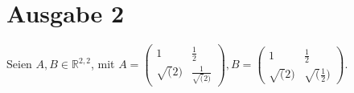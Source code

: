 \documentclass[11pt,a4paper,ngerman]{article}
\begin{document}

\section*{Ausgabe 2}

Seien $A,B \in \mathbb{R}^{2,2}$, mit
$ A = \left(
        \begin{array}{cc}
          1         & \frac{1}{2} \\
          \sqrt(2)  & \frac{1}{\sqrt(2)}
        \end{array}
      \right),
 B = \left(
        \begin{array}{cc}
          1         & \frac{1}{2} \\
          \sqrt(2)  & \sqrt(\frac{1}{2})
        \end{array}
      \right)
$.
\end{document}
